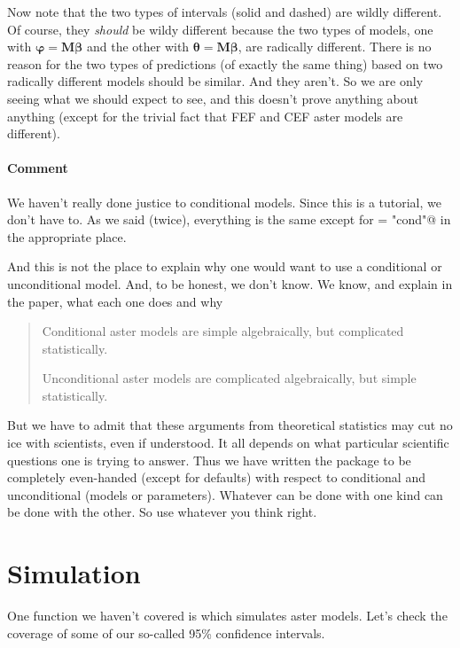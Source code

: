 \documentclass[11pt]{article}
\newcommand{\boldbeta}{{\boldsymbol{\beta}}}
\newcommand{\boldtheta}{{\boldsymbol{\theta}}}
\newcommand{\boldvarphi}{{\boldsymbol{\varphi}}}
\newcommand{\boldM}{{\mathbf{M}}}
\begin{document}
Now note that the two types of intervals (solid and dashed) are wildly
different.  Of course, they \emph{should} be wildy different because
the two types of models, one with $\boldvarphi = \boldM \boldbeta$
and the other with $\boldtheta = \boldM \boldbeta$,
are radically different.  There is no reason for the two types of predictions
(of exactly the same thing) based on two radically different models should
be similar.  And they aren't.  So we are only seeing what we should expect
to see, and this doesn't prove anything about anything (except for the
trivial fact that FEF and CEF aster models are different).

\paragraph{Comment} We haven't really done justice to conditional models.
Since this is a tutorial, we don't have to.  As we said (twice), everything
is the same except for \verb@type = "cond"@ in the appropriate place.

And this is not the place to explain why one would want to use a conditional
or unconditional model.  And, to be honest, we don't know.  We know, and
explain in the paper, what each one does and why
\begin{quote}
Conditional aster models are simple algebraically,
but complicated statistically.

Unconditional aster models are complicated algebraically,
but simple statistically.
\end{quote}

But we have to admit that these arguments from theoretical statistics
may cut no ice with scientists, even if understood.  It all depends
on what particular scientific questions one is trying to answer.
Thus we have written the \verb@aster@ package to be completely even-handed
(except for defaults) with respect to conditional and unconditional
(models or parameters).  Whatever can be done with one kind can be done
with the other.  So use whatever you think right.

\section{Simulation}

One function we haven't covered is \verb@raster@ which simulates aster
models.  Let's check the coverage of some of our
so-called 95\% confidence intervals.
\end{document}
